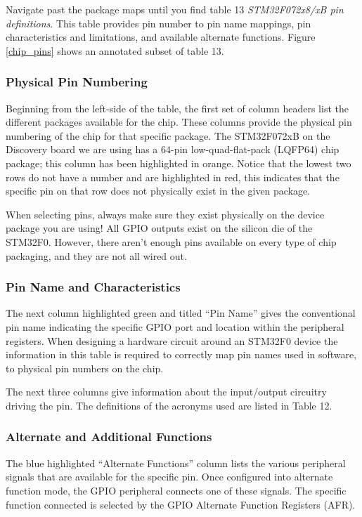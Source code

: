 \documentclass[11pt,fleqn]{book} %
\begin{document}
    Navigate past the package maps until you find table 13 \textit{STM32F072x8/xB pin definitions}. This table provides pin number to pin name mappings, pin characteristics and limitations, and available alternate functions. Figure \ref{chip_pins} shows an annotated subset of table 13. 
    
    \subsubsection{Physical Pin Numbering}
    Beginning from the left-side of the table, the first set of column headers list the different packages available for the chip. These columns provide the physical pin numbering of the chip for that specific package. The STM32F072xB on the Discovery board we are using has a 64-pin low-quad-flat-pack (LQFP64) chip package; this column has been highlighted in orange. Notice that the lowest two rows do not have a number and are highlighted in red, this indicates that the specific pin on that row does not physically exist in the given package. 
    
    \begin{warning}
        When selecting pins, always make sure they exist physically on the device package you are using! All GPIO outputs exist on the silicon die of the STM32F0. However, there aren't enough pins available on every type of chip packaging, and they are not all wired out.
    \end{warning}

    \subsubsection{Pin Name and Characteristics}
    The next column highlighted green and titled ``Pin Name'' gives the conventional pin name indicating the specific GPIO port and location within the peripheral registers. When designing a hardware circuit around an STM32F0 device the information in this table is required to correctly map pin names used in software, to physical pin numbers on the chip. 
   
   The next three columns give information about the input/output circuitry driving the pin. The definitions of the acronyms used are listed in Table 12. 
    
    \subsubsection{Alternate and Additional Functions}
    The blue highlighted ``Alternate Functions'' column lists the various peripheral signals that are available for the specific pin. Once configured into alternate function mode, the GPIO peripheral connects one of these signals. The specific function connected is selected by the GPIO Alternate Function Registers (AFR).
    
\end{document}
